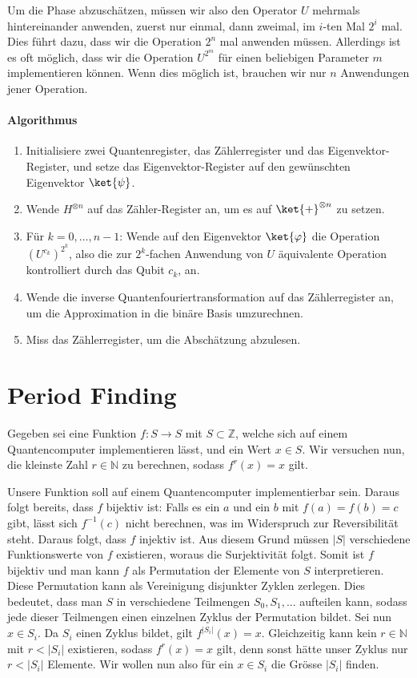 Um die Phase abzuschätzen, müssen wir also den Operator $U$ mehrmals hintereinander anwenden, zuerst nur einmal, dann zweimal, im $i$-ten Mal $2^i$ mal. Dies führt dazu, dass wir die Operation $2^n$ mal anwenden müssen. Allerdings ist es oft möglich, dass wir die Operation $U^{2^m}$ für einen beliebigen Parameter $m$ implementieren können. Wenn dies möglich ist, brauchen wir nur $n$ Anwendungen jener Operation.

\paragraph{Algorithmus}
\begin{enumerate}
    \item Initialisiere zwei Quantenregister, das Zählerregister und das Eigenvektor-Register, und setze das Eigenvektor-Register auf den gewünschten Eigenvektor $\ket{\psi}$.
    \item Wende $H^{\otimes n}$ auf das Zähler-Register an, um es auf $\ket{+}^{\otimes n}$ zu setzen.
    \item Für $k = 0, \dots, n - 1$: Wende auf den Eigenvektor $\ket{\varphi}$ die Operation $(U^{c_k})^{2^k}$, also die zur $2^k$-fachen Anwendung von $U$ äquivalente Operation kontrolliert durch das Qubit $c_k$, an.
    \item Wende die inverse Quantenfouriertransformation auf das Zählerregister an, um die Approximation in die binäre Basis umzurechnen.
    \item Miss das Zählerregister, um die Abschätzung abzulesen.
\end{enumerate}
 \newline

\section{Period Finding}
Gegeben sei eine Funktion $f : S \rightarrow S$ mit $S \subset \mathbb{Z}$, welche sich auf einem Quantencomputer implementieren lässt, und ein Wert $x \in S$. Wir versuchen nun, die kleinste Zahl $r \in \mathbb{N}$ zu berechnen, sodass $f^r(x) = x$ gilt.

Unsere Funktion soll auf einem Quantencomputer implementierbar sein. Daraus folgt bereits, dass $f$ bijektiv ist: Falls es ein $a$ und ein $b$ mit $f(a) = f(b) = c$ gibt, lässt sich $f^{-1}(c)$ nicht berechnen, was im Widerspruch zur Reversibilität steht. Daraus folgt, dass $f$ injektiv ist. Aus diesem Grund müssen $|S|$ verschiedene Funktionswerte von $f$ existieren, woraus die Surjektivität folgt. Somit ist $f$ bijektiv und man kann $f$ als Permutation der Elemente von $S$ interpretieren. Diese Permutation kann als Vereinigung disjunkter Zyklen zerlegen. %
Dies bedeutet, dass man $S$ in verschiedene Teilmengen $S_0, S_1, ...$ aufteilen kann, sodass jede dieser Teilmengen einen einzelnen Zyklus der Permutation bildet.
Sei nun $x \in S_i$. Da $S_i$ einen Zyklus bildet, gilt $f^{|S_i|}(x) = x$. Gleichzeitig kann kein $r \in \mathbb{N}$ mit $r < |S_i|$ existieren, sodass $f^r(x) = x$ gilt, denn sonst hätte unser Zyklus nur $r < |S_i|$ Elemente. Wir wollen nun also für ein $x \in S_i$ die Grösse $|S_i|$ finden.

